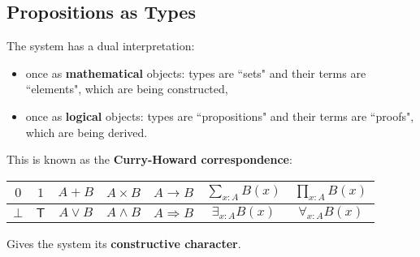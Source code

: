 \documentclass[11pt]{article}
\newcommand{\myemph}[1]{\textbf{#1}}    %
\begin{document}


\subsection*{Propositions as Types}

The system has a dual interpretation:
\begin{itemize}
\item once as \myemph{mathematical} objects: types are ``sets" and their terms are ``elements", which are being constructed,
\item once as \myemph{logical} objects: types are ``propositions" and their terms are ``proofs", which are being derived.
\end{itemize}

\medskip

This is known as the \myemph{Curry-Howard correspondence}:
\medskip


\begin{tabular}{|c|c|c|c|c|c|c|}
\hline
$0$ & $1$ & $A + B$ & $A\times B$ & $A\rightarrow B$ & $\sum_{x:A} B(x)$ & $\prod_{x:A} B(x)$\\[1ex]
\hline 
$\bot$ & $\mathsf{T}$ & $A \vee B$ & $A\wedge B$ & $A\Rightarrow B$ & $\exists_{x:A} B(x)$ & $\forall_{x:A} B(x)$\\
\hline
\end{tabular}

\bigskip

Gives the system its \myemph{constructive character}.


\end{document}
